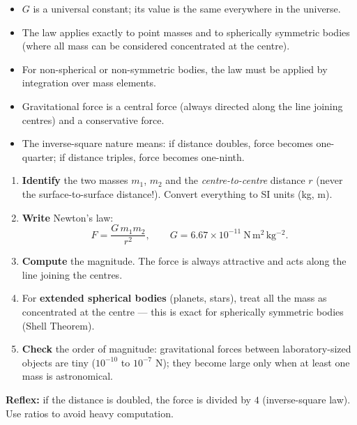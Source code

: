 \documentclass[11pt]{article}
\newcommand{\cle}[1]{{\popxbold\color{popdark}#1}}
\begin{document}
\begin{aretenir}
\begin{itemize}
\item $G$ is a universal constant; its value is the same everywhere in the universe.
\item The law applies exactly to point masses and to spherically symmetric bodies (where all mass can be considered concentrated at the centre).
\item For non-spherical or non-symmetric bodies, the law must be applied by integration over mass elements.
\item Gravitational force is a \cle{central force} (always directed along the line joining centres) and a \cle{conservative force}.
\item The inverse-square nature means: if distance doubles, force becomes one-quarter; if distance triples, force becomes one-ninth.
\end{itemize}
\end{aretenir}

\begin{methode}
\begin{enumerate}
\item \textbf{Identify} the two masses $m_1$, $m_2$ and the \emph{centre-to-centre} distance $r$ (never the surface-to-surface distance!). Convert everything to SI units (kg, m).
\item \textbf{Write} Newton's law:
\[ F = \frac{G\,m_1 m_2}{r^{2}}, \qquad G = 6.67\times 10^{-11}\ \mathrm{N\,m^{2}\,kg^{-2}}. \]
\item \textbf{Compute} the magnitude. The force is always \cle{attractive} and acts along the line joining the centres.
\item For \textbf{extended spherical bodies} (planets, stars), treat all the mass as concentrated at the centre — this is exact for spherically symmetric bodies (Shell Theorem).
\item \textbf{Check} the order of magnitude: gravitational forces between laboratory-sized objects are tiny ($10^{-10}$ to $10^{-7}$ N); they become large only when at least one mass is astronomical.
\end{enumerate}
\textbf{Reflex:} if the distance is doubled, the force is divided by $4$ (inverse-square law). Use ratios to avoid heavy computation.
\end{methode}
\end{document}

